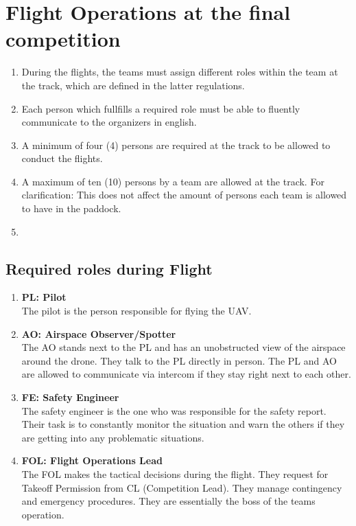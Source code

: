     \section{Flight Operations at the final competition}
    \begin{enumerate}
      \item During the flights, the teams must assign different roles within the team at the track, which are defined in the latter regulations.
      \item Each person which fullfills a required role must be able to fluently communicate to the organizers in english.
      \item A minimum of four (4) persons are required at the track to be allowed to conduct the flights.
      \item A maximum of ten (10) persons by a team are allowed at the track. For clarification: This does not affect the amount of persons each team is allowed to have in the paddock. 
      \item 
    \end{enumerate}

    \subsection{Required roles during Flight}
    \begin{enumerate}
      \item \textbf{PL: Pilot}\\The pilot is the person responsible for flying the UAV.
      \item \textbf{AO: Airspace Observer/Spotter}\\The AO stands next to the PL and has an unobstructed view of the airspace around the drone. They talk to the PL directly in person. The PL and AO are allowed to communicate via intercom if they stay right next to each other. 
      \item \textbf{FE: Safety Engineer}\\The safety engineer is the one who was responsible for the safety report. Their task is to constantly monitor the situation and warn the others if they are getting into any problematic situations. 
      \item \textbf{FOL: Flight Operations Lead}\\The FOL makes the tactical decisions during the flight. They request for Takeoff Permission from CL (Competition Lead). They manage contingency and emergency procedures. They are essentially the boss of the teams operation.
    \end{enumerate}

